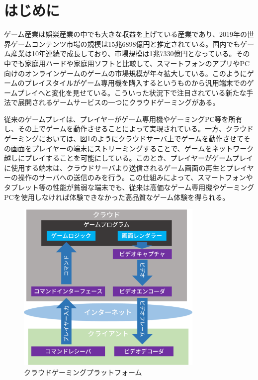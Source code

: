 \section{はじめに}
ゲーム産業は娯楽産業の中でも大きな収益を上げている産業であり、2019年の世界ゲームコンテンツ市場の規模は15兆6898億円と推定されている\cite{prtimes}。国内でもゲーム産業は10年連続で成長しており、市場規模は1兆7330億円となっている。その中でも家庭用ハードや家庭用ソフトと比較して、スマートフォンのアプリやPC向けのオンラインゲームのゲームの市場規模が年々拡大している。このようにゲームのプレイスタイルがゲーム専用機を購入するというものから汎用端末でのゲームプレイへと変化を見せている。こういった状況下で注目されている新たな手法で展開されるゲームサービスの一つにクラウドゲーミングがある。

従来のゲームプレイは、プレイヤーがゲーム専用機やゲーミングPC等を所有し、その上でゲームを動作させることによって実現されている。一方、クラウドゲーミングにおいては、図\ref{fig:cloudgaming}のようにクラウドサーバ上でゲームを動作させてその画面をプレイヤーの端末にストリーミングすることで、ゲームをネットワーク越しにプレイすることを可能にしている。このとき、プレイヤーがゲームプレイに使用する端末は、クラウドサーバより送信されるゲーム画面の再生とプレイヤーの操作のサーバへの送信のみを行う。この仕組みによって、スマートフォンやタブレット等の性能が貧弱な端末でも、従来は高価なゲーム専用機やゲーミングPCを使用しなければ体験できなかった高品質なゲーム体験を得られる。

\begin{figure}[t]
    \centering
    \includegraphics[width=0.8\textwidth,keepaspectratio,clip]{img/cloudgaming.eps}
    \caption{クラウドゲーミングプラットフォーム}
    \label{fig:cloudgaming}
\end{figure}

